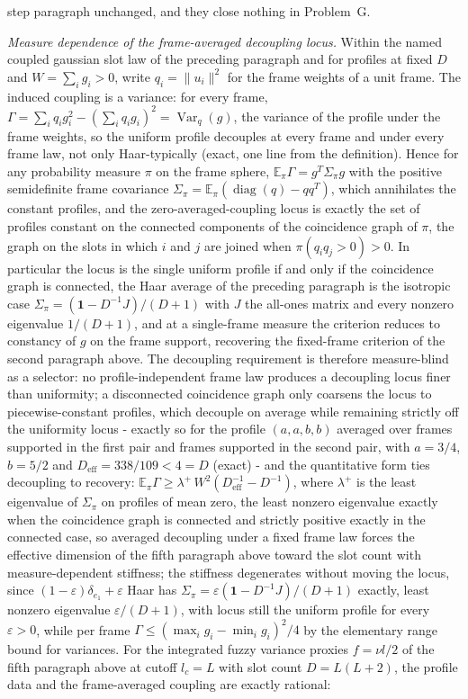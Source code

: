 step paragraph unchanged, and they close nothing in Problem~G.

\emph{Measure dependence of the frame-averaged decoupling locus.} Within the named coupled gaussian slot law of the preceding paragraph and for profiles at fixed \(D\) and \(W=\sum_{i}g_{i}>0\), write \(q_{i}=\|u_{i}\|^{2}\) for the frame weights of a unit frame. The induced coupling is a variance: for every frame, \(\Gamma=\sum_{i}q_{i}g_{i}^{2}-(\sum_{i}q_{i}g_{i})^{2}=\operatorname{Var}_{q}(g)\), the variance of the profile under the frame weights, so the uniform profile decouples at every frame and under every frame law, not only Haar-typically (exact, one line from the definition). Hence for any probability measure \(\pi\) on the frame sphere, \(\mathbb{E}_{\pi}\Gamma=g^{T}\Sigma_{\pi}g\) with the positive semidefinite frame covariance \(\Sigma_{\pi}=\mathbb{E}_{\pi}(\operatorname{diag}(q)-qq^{T})\), which annihilates the constant profiles, and the zero-averaged-coupling locus is exactly the set of profiles constant on the connected components of the coincidence graph of \(\pi\), the graph on the slots in which \(i\) and \(j\) are joined when \(\pi(q_{i}q_{j}>0)>0\). In particular the locus is the single uniform profile if and only if the coincidence graph is connected, the Haar average of the preceding paragraph is the isotropic case \(\Sigma_{\pi}=(\mathbf 1-D^{-1}J)/(D+1)\) with \(J\) the all-ones matrix and every nonzero eigenvalue \(1/(D+1)\), and at a single-frame measure the criterion reduces to constancy of \(g\) on the frame support, recovering the fixed-frame criterion of the second paragraph above. The decoupling requirement is therefore measure-blind as a selector: no profile-independent frame law produces a decoupling locus finer than uniformity; a disconnected coincidence graph only coarsens the locus to piecewise-constant profiles, which decouple on average while remaining strictly off the uniformity locus - exactly so for the profile \((a,a,b,b)\) averaged over frames supported in the first pair and frames supported in the second pair, with \(a=3/4\), \(b=5/2\) and \(D_{\mathrm{eff}}=338/109<4=D\) (exact) - and the quantitative form ties decoupling to recovery: \(\mathbb{E}_{\pi}\Gamma\ge\lambda^{+}\,W^{2}(D_{\mathrm{eff}}^{-1}-D^{-1})\), where \(\lambda^{+}\) is the least eigenvalue of \(\Sigma_{\pi}\) on profiles of mean zero, the least nonzero eigenvalue exactly when the coincidence graph is connected and strictly positive exactly in the connected case, so averaged decoupling under a fixed frame law forces the effective dimension of the fifth paragraph above toward the slot count with measure-dependent stiffness; the stiffness degenerates without moving the locus, since \((1-\varepsilon)\delta_{e_{1}}+\varepsilon\) Haar has \(\Sigma_{\pi}=\varepsilon(\mathbf 1-D^{-1}J)/(D+1)\) exactly, least nonzero eigenvalue \(\varepsilon/(D+1)\), with locus still the uniform profile for every \(\varepsilon>0\), while per frame \(\Gamma\le(\max_{i}g_{i}-\min_{i}g_{i})^{2}/4\) by the elementary range bound for variances. For the integrated fuzzy variance proxies \(f=\nu l/2\) of the fifth paragraph above at cutoff \(l_c=L\) with slot count \(D=L(L+2)\), the profile data and the frame-averaged coupling are exactly rational: 